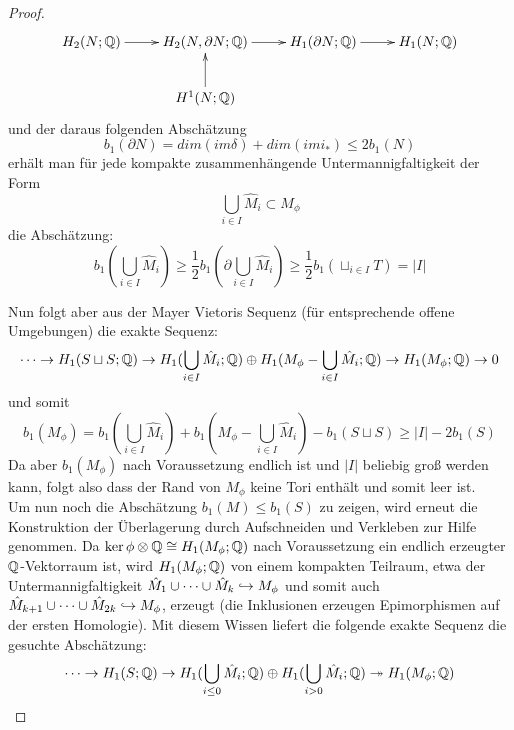 \begin{proof}
	\[
	 \begin{xy}
	 	\xymatrix{
	 	H_2(N;\QQ) \ar[r]&  H_2(N,\partial N ; \QQ) \ar[r]& H_1(\partial N;\QQ) \ar[r]& H_1(N;\QQ) \\
	 	& H^1(N;\QQ)\ar[u]&&}
	 \end{xy}
	 \] 
	 und der daraus folgenden Abschätzung
	 \[
	 	b_1(\partial N) = dim(im \delta) + dim(im i_*) \leq  2b_1(N)
	 \]
	 erhält man für jede kompakte zusammenhängende Untermannigfaltigkeit der Form
	 \[
	  	\bigcup_{i\in I} \hat M_i \subset M_\phi
	  \]
	  die Abschätzung:
	  \[
	   	b_1(\bigcup_{i\in I} \hat M_i)\geq \frac{1}{2}b_1(\partial \bigcup_{i\in I} \hat M_i) \geq \frac{1}{2}b_1(\sqcup_{i \in I}T) = |I|
	  \]


	  Nun folgt aber aus der Mayer Vietoris Sequenz (für entsprechende offene Umgebungen) die exakte Sequenz:
	  \[
	  	\cdots\to H_1(S\sqcup S;\mathbb{Q}) \to H_1(\bigcup_{i \in I} \hat M_i;\mathbb{Q}) \oplus H_1(M_\phi -\bigcup_{i \in I} \hat M_i;\mathbb{Q}) \to H_1(M_\phi;\mathbb{Q}) \to 0
	  \]
	  und somit
	  \[
	  	b_1(M_\phi)= b_1(\bigcup_{i \in I} \hat M_i)+b_1(M_\phi -\bigcup_{i \in I} \hat M_i)-b_1(S\sqcup S) \geq |I| -2b_1(S)
	  \]
	  Da aber $b_1(M_\phi)$ nach Voraussetzung endlich ist und $|I|$ beliebig groß werden kann, folgt also dass der Rand von $M_\phi$ keine Tori enthält und somit leer ist.\\
	  Um nun noch die Abschätzung $b_1(M) \leq b_1(S)$ zu zeigen, wird erneut die Konstruktion der Überlagerung durch Aufschneiden und Verkleben zur Hilfe genommen. Da $\ker\phi \otimes \mathbb{Q} \cong H_1(M_\phi;\mathbb{Q})$ nach Voraussetzung ein endlich erzeugter $\mathbb{Q}$-Vektorraum ist, wird $H_1(M_\phi;\mathbb{Q})$ von einem kompakten Teilraum, etwa der Untermannigfaltigkeit $\hat M_1 \cup \cdots \cup \hat M_k \hookrightarrow M_\phi$ und somit auch $\hat M_{k+1} \cup \cdots \cup \hat M_{2k}\hookrightarrow M_\phi$, erzeugt (die Inklusionen erzeugen Epimorphismen auf der ersten Homologie). Mit diesem Wissen liefert die folgende exakte Sequenz die gesuchte Abschätzung:
	  \[
	  	\cdots \to H_1(S;\mathbb{Q}) \to H_1(\bigcup_{i\leq 0}\hat M_i;\mathbb{Q}) \oplus H_1(\bigcup_{i>0} \hat M_i;\mathbb{Q}) \twoheadrightarrow H_1(M_\phi;\mathbb{Q})
	  \]
\end{proof}

